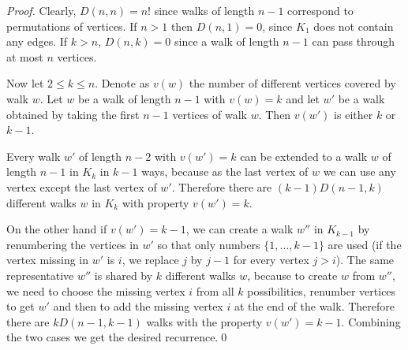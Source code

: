 \begin{proof}
Clearly, $D(n,n)=n!$ since walks of length $n-1$ correspond to
permutations of vertices.  If $n>1$ then $D(n,1)=0$, since $K_1$ does
not contain any edges.  If $k>n$, $D(n,k)=0$ since a walk of length
$n-1$ can pass through at most $n$ vertices.

Now let $2\leq k\leq n$. Denote as $v(w)$ the number of different
vertices covered by walk $w$. Let $w$ be a walk of length $n-1$ with
$v(w)=k$ and let $w'$ be a walk obtained by taking the first 
$n-1$ vertices of walk $w$. Then $v(w')$ is either $k$ or $k-1$. 

Every walk $w'$ of length $n-2$ with $v(w')=k$ can be extended to a
walk $w$ of length $n-1$ in $K_k$ in $k-1$ ways, because as the last vertex
of $w$ we can use any vertex except the last vertex of $w'$. Therefore
there are $(k-1) D(n-1,k)$ different walks $w$ in $K_k$ with
property $v(w')=k$.

On the other hand if $v(w')=k-1$, we can create a walk $w''$ in
$K_{k-1}$ by renumbering the vertices in $w'$ so that only numbers
$\{1,\dots,k-1\}$ are used (if the vertex missing in $w'$ is $i$, we
replace $j$ by $j-1$ for every vertex $j>i$).  The same
representative $w''$ is shared by $k$ different walks $w$, because to
create $w$ from $w''$, we need to choose the missing vertex $i$ from
all $k$ possibilities, renumber vertices to get $w'$ and then to add
the missing vertex $i$ at the end of the walk. Therefore there are
$kD(n-1,k-1)$ walks with the property $v(w')=k-1$. Combining the two
cases we get the desired recurrence.\qed
\end{proof}

